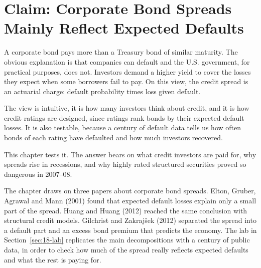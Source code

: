 \makeatletter
{}
\makeatother

\chapter{Claim: Corporate Bond Spreads Mainly Reflect Expected Defaults}
\label{ch:18}

A corporate bond pays more than a Treasury bond of similar maturity. The obvious explanation is that companies can default and the U.S. government, for practical purposes, does not. Investors demand a higher yield to cover the losses they expect when some borrowers fail to pay. On this view, the credit spread is an actuarial charge: default probability times loss given default.

The view is intuitive, it is how many investors think about credit, and it is how credit ratings are designed, since ratings rank bonds by their expected default losses. It is also testable, because a century of default data tells us how often bonds of each rating have defaulted and how much investors recovered.

This chapter tests it. The answer bears on what credit investors are paid for, why spreads rise in recessions, and why highly rated structured securities proved so dangerous in 2007--08.

The chapter draws on three papers about corporate bond spreads. Elton, Gruber, Agrawal and Mann (2001) found that expected default losses explain only a small part of the spread. Huang and Huang (2012) reached the same conclusion with structural credit models. Gilchrist and Zakraj\v{s}ek (2012) separated the spread into a default part and an excess bond premium that predicts the economy. The lab in Section~\ref{sec:18-lab} replicates the main decompositions with a century of public data, in order to check how much of the spread really reflects expected defaults and what the rest is paying for.

